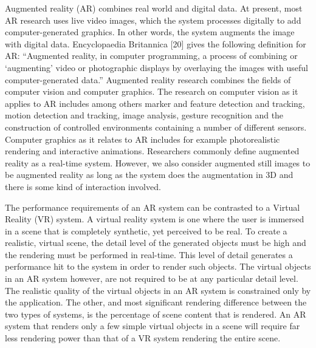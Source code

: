 Augmented reality (AR) combines real world and digital data. At present, most AR research uses live video images, which the system processes digitally to add computer-generated graphics. In other words, the system augments the image with digital data. Encyclopaedia Britannica [20] gives the following definition for AR: “Augmented reality, in computer programming, a process of combining or ‘augmenting’ video or photographic displays by overlaying the images with useful computer-generated data.” Augmented reality research combines the fields of computer vision and computer graphics. The research on computer vision as it applies to AR includes among others marker and feature detection and tracking, motion detection and tracking, image analysis, gesture recognition and the construction of controlled environments containing a number of different sensors. Computer graphics as it relates to AR includes for example photorealistic rendering and interactive animations. Researchers commonly define augmented reality as a real-time system. However, we also consider augmented still images to be augmented reality as long as the system does the augmentation in 3D and there is some kind of interaction involved.

The performance requirements of an AR system can be contrasted to a Virtual Reality (VR) system. A virtual reality system is one where the user is immersed in a scene that is completely synthetic, yet perceived to be real. To create a realistic, virtual scene, the detail level of the generated objects must be high and the rendering must be performed in real-time. This level of detail generates a performance hit to the system in order to render such objects. The virtual objects in an AR system however, are not required to be at any particular detail level. The realistic quality of the virtual objects in an AR system is constrained only by the application. The other, and most significant rendering difference between the two types of systems, is the percentage of scene content that is rendered. An AR system that renders only a few simple virtual objects in a scene will require far less rendering power than that of a VR system rendering the entire scene.


